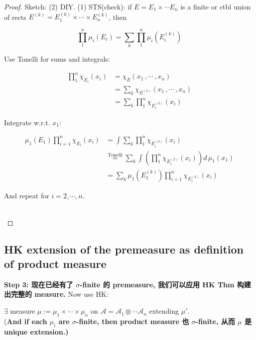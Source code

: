 \documentclass{qlnotes-export}
\begin{document}
\begin{proof}

Sketch: (2) DIY. (1) STS(check): if \(E = E_{1} \times \cdots E_{n}\) is a finite or ctbl union of rects \(E^{(k)} = E_{1}^{(k)} \times \cdots \times E_{n}^{(k)}\), then

\[\prod\limits_{1}^{n}\mu_{i}(E_{i}) = \sum\limits_{k}\prod\limits_{1}^{n}\mu_{i}(E_{i}^{(k)})\]

Use Tonelli for sums and integrals:

\[\begin{matrix}
{\prod\limits_{1}^{n}\chi_{E_{i}}(x_{i})} & {= \chi_{E}(x_{1}\,,\cdots\,,x_{n})} \\
 & {= \sum\limits_{k}\chi_{E^{(k)}}(x_{1}\,,\cdots\,,x_{n})} \\
 & {= \sum\limits_{k}\prod\limits_{1}^{n}\chi_{E_{i}^{(k)}}(x_{i})}
\end{matrix}\]

Integrate w.r.t. \(x_{1}\):

\[\begin{matrix}
{\mu_{1}(E_{1})\prod\limits_{i = 1}^{n}\chi_{E_{i}}(x_{i})} & {= \int\sum\limits_{k}\prod\limits_{1}^{n}\chi_{E_{i}^{(k)}}(x_{i})} \\
 & {\overset{\text{Tonelli}}{=}\sum\limits_{k}\int(\prod\limits_{1}^{n}\chi_{E_{i}^{(k)}}(x_{i}))d\,\mu_{1}(x_{1})} \\
 & {= \sum\limits_{k}\mu_{1}(E_{1}^{(k)})\prod\limits_{i = 1}^{n}\chi_{E_{i}^{(k)}}(x_{i})}
\end{matrix}\]

And repeat for \(i = 2,\cdots,n\).\\
\strut \\

\end{proof}

\subsection{HK extension of the premeasure as definition of product measure}\label{hk-extension-of-the-premeasure-as-definition-of-product-measure}

\textbf{Step 3: 现在已经有了 \(\sigma\)-finite 的 premeasure, 我们可以应用 HK Thm 构建出完整的 measure.} Now use HK:

\begin{corollary}

\(\exists\) measure \(\mu := \mu_{1} \times \cdots \times \mu_{n}\) on \(\mathcal{A} = \mathcal{A}_{1} \otimes \cdots\mathcal{A}_{n}\) extending \(\mu'\).\\
(\textbf{And if each \(\mu_{i}\) are \(\sigma\)-finite, then product measure 也 \(\sigma\)-finite, 从而 \(\mu\) 是 unique extension.)}

\end{corollary}
\end{document}
